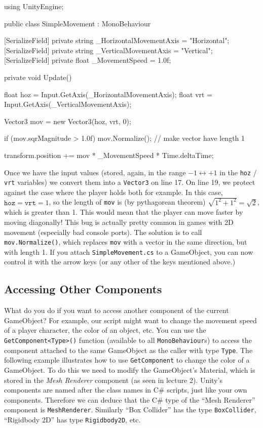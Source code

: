 \documentclass[11pt]{article}
\def\StartLineAt#1{\lstset{firstnumber=#1}}
\begin{document}
\StartLineAt{1}
\begin{csharp}
using UnityEngine;

public class SimpleMovement : MonoBehaviour
{
    [SerializeField]
    private string _HorizontalMovementAxis = "Horizontal";
    [SerializeField]
    private string _VerticalMovementAxis = "Vertical";
    [SerializeField]
    private float _MovementSpeed = 1.0f;

    private void Update()
    {
        float hoz = Input.GetAxis(_HorizontalMovementAxis);
        float vrt = Input.GetAxis(_VerticalMovementAxis);

        Vector3 mov = new Vector3(hoz, vrt, 0);

        if (mov.sqrMagnitude > 1.0f)
            mov.Normalize(); // make vector have length 1

        transform.position += mov * _MovementSpeed * Time.deltaTime;
    }
}
\end{csharp}

\noindent Once we have the input values (stored, again, in the range $-1 \leftrightarrow +1$ in the 
\lstinline|hoz| / \lstinline|vrt| variables) we convert them into a \lstinline|Vector3| on line 17.
On line 19, we protect against the case where the player holds both \keys{\arrowkey{>}+\arrowkey{^}}
for example.  In this case, $\texttt{hoz} = \texttt{vrt} = 1$, so the length of \texttt{mov} is
(by pythagorean theorem) $\sqrt{1^2 + 1^2} = \sqrt{2}$, which is greater than 1.  This would mean
that the player can move faster by moving diagonally!  This bug is actually pretty common in games
with 2D movement (especially bad console ports).  The solution is to call \lstinline|mov.Normalize()|,
which replaces \lstinline|mov| with a vector in the same direction, but with length 1.  If you attach
\lstinline|SimpleMovement.cs| to a GameObject, you can now control it with the arrow keys
(or any other of the keys mentioned above.)

\subsection{Accessing Other Components}

What do you do if you want to access another component of the current GameObject?  For example, our
script might want to change the movement speed of a player character, the color of an object, etc.
You can use the \lstinline|GetComponent<Type>()| function (available to all \lstinline|MonoBehaviour|s)
to access the component attached to the same GameObject as the caller with type \lstinline|Type|.
The following example illustrates how to use \lstinline|GetComponent| to change the color of a
GameObject.  To do this we need to modify the GameObject's Material, which is stored in the
\textit{Mesh Renderer} component (as seen in lecture 2).  Unity's components are named after the class
names in C\# scripts, just like your own components.  Therefore we can deduce that the C\# type
of the ``Mesh Renderer'' component is \lstinline|MeshRenderer|.  Similarly ``Box Collider'' has
the type \lstinline|BoxCollider|, ``Rigidbody 2D'' has type \lstinline|Rigidbody2D|, etc.
\end{document}
